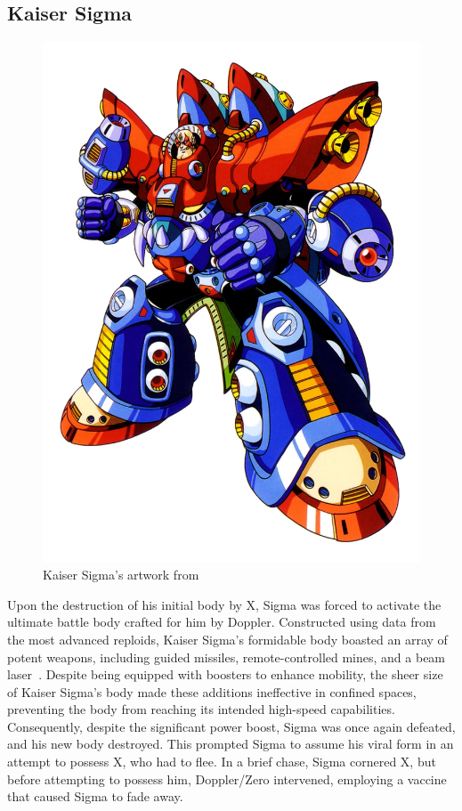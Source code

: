 \subsection{Kaiser Sigma}\label{boss:Kaiser_sigma}
\begin{figure}[htp]
	\centering
	\includegraphics[height=\portraitsize]{figures/X3/Doppler_stages/KaiserSigma.png}
	\caption{Kaiser Sigma's artwork from~\cite{book:MMX_Complete_art}}
\end{figure}
Upon the destruction of his initial body by X, Sigma was forced to activate the ultimate battle body crafted for him by Doppler. Constructed using data from the most advanced reploids, Kaiser Sigma's formidable body boasted an array of potent weapons, including guided missiles, remote-controlled mines, and a beam laser~\cite{wayback:X3_resources}. Despite being equipped with boosters to enhance mobility, the sheer size of Kaiser Sigma's body made these additions ineffective in confined spaces, preventing the body from reaching its intended high-speed capabilities. Consequently, despite the significant power boost, Sigma was once again defeated, and his new body destroyed. This prompted Sigma to assume his viral form in an attempt to possess X, who had to flee. In a brief chase, Sigma cornered X, but before attempting to possess him, Doppler/Zero intervened, employing a vaccine that caused Sigma to fade away.

